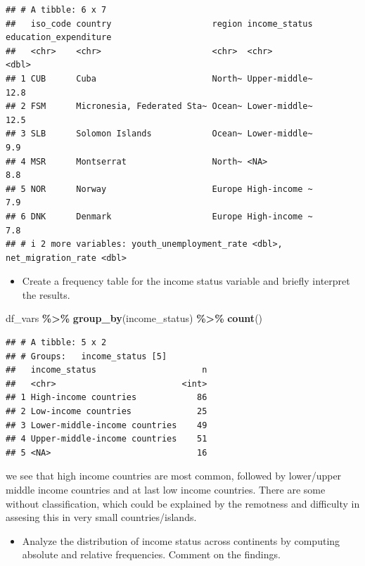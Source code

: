 \documentclass[
]{article}
\newenvironment{Shaded}{\begin{snugshade}}{\end{snugshade}}
\newcommand{\FunctionTok}[1]{\textcolor[rgb]{0.13,0.29,0.53}{\textbf{#1}}}
\newcommand{\NormalTok}[1]{#1}
\newcommand{\SpecialCharTok}[1]{\textcolor[rgb]{0.81,0.36,0.00}{\textbf{#1}}}
\providecommand{\tightlist}{%
  \setlength{\itemsep}{0pt}\setlength{\parskip}{0pt}}
\begin{document}
\begin{verbatim}
## # A tibble: 6 x 7
##   iso_code country                    region income_status education_expenditure
##   <chr>    <chr>                      <chr>  <chr>                         <dbl>
## 1 CUB      Cuba                       North~ Upper-middle~                  12.8
## 2 FSM      Micronesia, Federated Sta~ Ocean~ Lower-middle~                  12.5
## 3 SLB      Solomon Islands            Ocean~ Lower-middle~                   9.9
## 4 MSR      Montserrat                 North~ <NA>                            8.8
## 5 NOR      Norway                     Europe High-income ~                   7.9
## 6 DNK      Denmark                    Europe High-income ~                   7.8
## # i 2 more variables: youth_unemployment_rate <dbl>, net_migration_rate <dbl>
\end{verbatim}

\begin{itemize}
\tightlist
\item
  Create a frequency table for the income status variable and briefly
  interpret the results.
\end{itemize}

\begin{Shaded}
\begin{Highlighting}[]
\NormalTok{df\_vars }\SpecialCharTok{\%\textgreater{}\%}
  \FunctionTok{group\_by}\NormalTok{(income\_status) }\SpecialCharTok{\%\textgreater{}\%}
  \FunctionTok{count}\NormalTok{()}
\end{Highlighting}
\end{Shaded}

\begin{verbatim}
## # A tibble: 5 x 2
## # Groups:   income_status [5]
##   income_status                     n
##   <chr>                         <int>
## 1 High-income countries            86
## 2 Low-income countries             25
## 3 Lower-middle-income countries    49
## 4 Upper-middle-income countries    51
## 5 <NA>                             16
\end{verbatim}

we see that high income countries are most common, followed by
lower/upper middle income countries and at last low income countries.
There are some without classification, which could be explained by the
remotness and difficulty in assesing this in very small
countries/islands.

\begin{itemize}
\tightlist
\item
  Analyze the distribution of income status across continents by
  computing absolute and relative frequencies. Comment on the findings.
\end{itemize}
\end{document}
